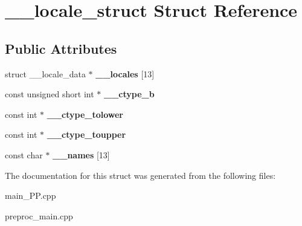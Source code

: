 \hypertarget{struct____locale__struct}{\section{\+\_\+\+\_\+locale\+\_\+struct Struct Reference}
\label{struct____locale__struct}
}
\subsection*{Public Attributes}
\begin{DoxyCompactItemize}
\item 
\hypertarget{struct____locale__struct_acdf4edaa1f146ea7b51bd66d8adecaae}{struct \+\_\+\+\_\+locale\+\_\+data $\ast$ {\bfseries \+\_\+\+\_\+locales} \mbox{[}13\mbox{]}}\label{struct____locale__struct_acdf4edaa1f146ea7b51bd66d8adecaae}

\item 
\hypertarget{struct____locale__struct_a9a5f93884968651505550b95049408f3}{const unsigned short int $\ast$ {\bfseries \+\_\+\+\_\+ctype\+\_\+b}}\label{struct____locale__struct_a9a5f93884968651505550b95049408f3}

\item 
\hypertarget{struct____locale__struct_a98f1e586c037e55a83e8817cecba67df}{const int $\ast$ {\bfseries \+\_\+\+\_\+ctype\+\_\+tolower}}\label{struct____locale__struct_a98f1e586c037e55a83e8817cecba67df}

\item 
\hypertarget{struct____locale__struct_ae9c0c9115596f8e918e0f79e4ebd1080}{const int $\ast$ {\bfseries \+\_\+\+\_\+ctype\+\_\+toupper}}\label{struct____locale__struct_ae9c0c9115596f8e918e0f79e4ebd1080}

\item 
\hypertarget{struct____locale__struct_a40bd7134bf6700665fdfed7dbfd64090}{const char $\ast$ {\bfseries \+\_\+\+\_\+names} \mbox{[}13\mbox{]}}\label{struct____locale__struct_a40bd7134bf6700665fdfed7dbfd64090}

\end{DoxyCompactItemize}


The documentation for this struct was generated from the following files\+:\begin{DoxyCompactItemize}
\item 
main\+\_\+\+P\+P.\+cpp\item 
preproc\+\_\+main.\+cpp\end{DoxyCompactItemize}
